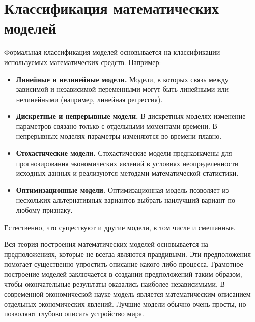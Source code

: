 \section{Классификация математических моделей}

Формальная классификация моделей основывается на классификации используемых математических средств.
Например:
\begin{itemize}
	\item \textbf{Линейные и нелинейные модели.}
	Модели, в которых связь между зависимой и независимой переменными могут быть линейными или нелинейными (например, линейная регрессия).
	\item \textbf{Дискретные и непрерывные модели.}
	В дискретных моделях изменение параметров связано только с отдельными моментами времени.
	В непрерывных моделях параметры изменяются во времени плавно.
	\item \textbf{Стохастические модели.}
	Стохастические модели предназначены для прогнозирования экономических явлений в условиях неопределенности исходных данных и реализуются методами математической статистики.
	\item \textbf{Оптимизационные модели.}
	Оптимизационная модель позволяет из нескольких альтернативных вариантов выбрать наилучший вариант по любому признаку.
\end{itemize}
Естественно, что существуют и другие модели, в том числе и смешанные.

Вся теория построения математических моделей основывается на предположениях, которые не всегда являются правдивыми.
Эти предположения помогает существенно упростить описание какого-либо процесса.
Грамотное построение моделей заключается в создании предположений таким образом, чтобы окончательные результаты оказались наиболее независимыми.
В современной экономической науке модель является математическим описанием отдельных экономических явлений.
Лучшие модели обычно очень просты, но позволяют глубоко описать устройство мира.
